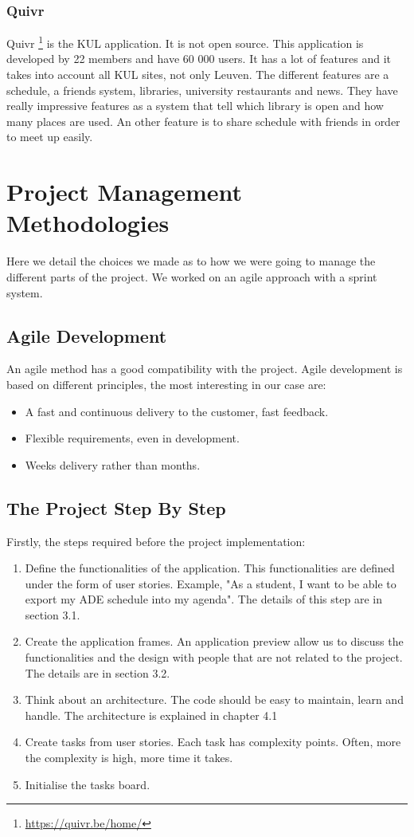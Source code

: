 \documentclass{eplmastersthesis}
\begin{document}
\subsubsection{Quivr}
Quivr \footnote{\url{https://quivr.be/home/}} is the KUL application. It is not open source. This application is developed by 22 members and have 60 000 users. It has a lot of features and it takes into account all KUL sites, not only Leuven. The different features are a schedule, a friends system, libraries, university restaurants and news. They have really impressive features as a system that tell which library is open and how many places are used. An other feature is to share schedule with friends in order to meet up easily. 


\section{Project Management Methodologies}

Here we detail the choices we made as to how we were going to manage the different parts of the project. We worked on an agile approach with a sprint system. 

\subsection{Agile Development}
An agile method has a good compatibility with the project. Agile development is based on different principles, the most interesting in our case are:
\begin{itemize}
\item A fast and continuous delivery to the customer, fast feedback.
\item Flexible requirements, even in development.
\item Weeks delivery rather than months.
\end{itemize}

\subsection{The Project Step By Step}

Firstly, the steps required before the project implementation:
\begin{enumerate}
\item Define the functionalities of the application. This functionalities are defined under the form of user stories. Example, "As a student, I want to be able to export my ADE schedule into my agenda". The details of this step are in section 3.1.
\item Create the application frames. An application preview allow us to discuss the functionalities and the design with people that are not related to the project. The details are in section 3.2.
\item Think about an architecture. The code should be easy to maintain, learn and handle. The architecture is explained in chapter 4.1
\item Create tasks from user stories. Each task has complexity points. Often, more the complexity is high, more time it takes.
\item Initialise the tasks board.
\end{enumerate}
\end{document}
